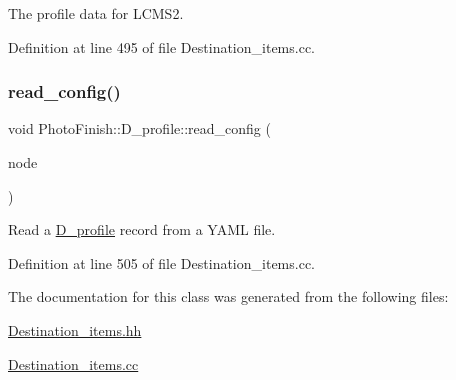 The profile data for L\+C\+M\+S2. 



Definition at line 495 of file Destination\+\_\+items.\+cc.

\mbox{\label{class_photo_finish_1_1_d__profile_a47e507f6e2a4ec5a87ac6074bdc9d902}} 
\subsubsection{\texorpdfstring{read\+\_\+config()}{read\_config()}}
{\footnotesize\ttfamily void Photo\+Finish\+::\+D\+\_\+profile\+::read\+\_\+config (\begin{DoxyParamCaption}\item[{const Y\+A\+M\+L\+::\+Node \&}]{node }\end{DoxyParamCaption})}



Read a \hyperlink{class_photo_finish_1_1_d__profile}{D\+\_\+profile} record from a Y\+A\+ML file. 



Definition at line 505 of file Destination\+\_\+items.\+cc.



The documentation for this class was generated from the following files\+:\begin{DoxyCompactItemize}
\item 
\hyperlink{_destination__items_8hh}{Destination\+\_\+items.\+hh}\item 
\hyperlink{_destination__items_8cc}{Destination\+\_\+items.\+cc}\end{DoxyCompactItemize}
